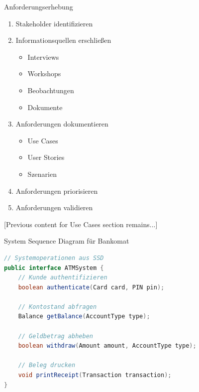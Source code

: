 \begin{KR}{Anforderungserhebung}
\begin{enumerate}
    \item Stakeholder identifizieren
    \item Informationsquellen erschließen
    \begin{itemize}
        \item Interviews
        \item Workshops
        \item Beobachtungen
        \item Dokumente
    \end{itemize}
    \item Anforderungen dokumentieren
    \begin{itemize}
        \item Use Cases
        \item User Stories
        \item Szenarien
    \end{itemize}
    \item Anforderungen priorisieren
    \item Anforderungen validieren
\end{enumerate}
\end{KR}

[Previous content for Use Cases section remains...]

\begin{example}{System Sequence Diagram für Bankomat}
\begin{lstlisting}[language=Java]
// Systemoperationen aus SSD
public interface ATMSystem {
    // Kunde authentifizieren
    boolean authenticate(Card card, PIN pin);
    
    // Kontostand abfragen
    Balance getBalance(AccountType type);
    
    // Geldbetrag abheben
    boolean withdraw(Amount amount, AccountType type);
    
    // Beleg drucken
    void printReceipt(Transaction transaction);
}
\end{lstlisting}
\end{example}

